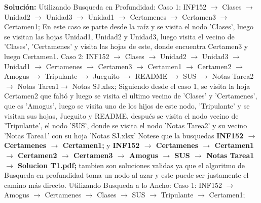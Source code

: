 \documentclass[letterpaper,10pt]{article}
\begin{document}
\begin{enumerate}
\begin{enumerate}
    \textbf{Solución:}
    \newline
    Utilizando Busqueda en Profundidad:
    \newline\newline
    Caso 1: INF152 $\rightarrow$ Clases $\rightarrow$ Unidad2 $\rightarrow$ Unidad3 $\rightarrow$ Unidad1 $\rightarrow$ Certamenes $\rightarrow$ Certamen3 $\rightarrow$ Certamen1;
    \newline\newline
    En este caso se parte desde la raíz y se visita el nodo 'Clases', luego se visitan las hojas Unidad1, Unidad2 y Unidad3, luego visita el vecino de 'Clases', 'Certamenes' y visita las hojas de este, donde encuentra Certamen3 y luego Certamen1.
    \newline\newline
    Caso 2: INF152 $\rightarrow$ Clases $\rightarrow$ Unidad2 $\rightarrow$ Unidad3 $\rightarrow$ Unidad1 $\rightarrow$ Certamenes $\rightarrow$ Certamen3 $\rightarrow$ Certamen1 $\rightarrow$ Certamen2 $\rightarrow$ Amogus $ \rightarrow$ Tripulante $ \rightarrow$ Jueguito $ \rightarrow$ README $ \rightarrow$ SUS $ \rightarrow$ Notas Tarea2 $ \rightarrow$ Notas Tarea1$ \rightarrow$ Notas SJ.xlsx;
    \newline\newline
    Siguiendo desde el caso 1, se visita la hoja Certamen2 que faltó y luego se visita el ultimo vecino de 'Clases' y 'Certamenes', que es 'Amogus', luego se visita uno de los hijos de este nodo, 'Tripulante' y se visitan sus hojas, Jueguito y README, después se visita el nodo vecino de 'Tripulante', el nodo 'SUS', donde se visita el nodo 'Notas Tarea2' y su vecino 'Notas Tarea1' con su hoja 'Notas SJ.xlsx'
    \newline\newline
    Notese que la busquedas \textbf{INF152 $\rightarrow$ Certamenes $\rightarrow$ Certamen1;} y  \textbf{INF152 $\rightarrow$ Certamenes $\rightarrow$ Certamen1 $\rightarrow$ Certamen2 $\rightarrow$ Certamen3 $\rightarrow$ Amogus $\rightarrow$ SUS $\rightarrow$ Notas Tarea1 $\rightarrow$ Solucion T1.pdf;}
     tambien son soluciones validas ya que el algoritmo de Busqueda en profundidad toma un nodo al azar y este puede ser justamente el camino más directo.
    \newline\newline
    Utilizando Busqueda a lo Ancho:
    \newline\newline
    Caso 1: INF152 $\rightarrow$ Amogus $\rightarrow$ Certamenes $\rightarrow$ Clases $\rightarrow$ SUS $\rightarrow$ Tripulante $\rightarrow$ Certamen1;

\end{enumerate}
\end{enumerate}
\end{document}
